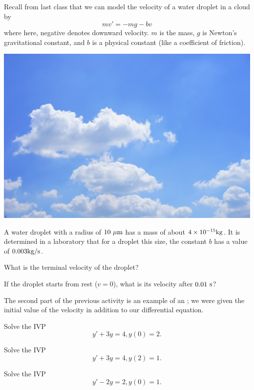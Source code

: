 
\begin{applicationActivities}

\begin{observation}
Recall from last class that we can model the velocity of a water droplet in a cloud by
\[mv'=-mg-bv\]
where here, negative denotes downward velocity.  \(m\) is the mass, \(g\) is Newton's gravitational constant, and \(b\) is a physical constant (like a coefficient of friction).
\begin{center}
\includegraphics[scale=0.2]{media/cloud.jpg}
\end{center}
\end{observation}

\begin{activity}{25}
A water droplet with a radius of \(10\ {\rm \mu m}\) has a mass of about \(4 \times 10^{-15} {\rm kg}\).  It is determined in a laboratory that for a droplet this size, the constant \(b\) has a value of \(0.003 {\rm kg/s}\).
\begin{subactivity}
What is the terminal velocity of the droplet?
\end{subactivity}
\begin{subactivity}If the droplet starts from rest (\(v=0\)), what is its velocity after \(0.01\ {\rm s}\)?
\end{subactivity}
\end{activity}

\begin{definition}
The second part of the previous activity is an example of an ; we were given the initial value of the velocity in addition to our differential equation.
\end{definition}

\begin{activity}{10}
Solve the IVP
\[y'+3y=4, y(0)=2.\]
\end{activity}

\begin{activity}{5}
Solve the IVP
\[y'+3y=4, y(2)=1.\]
\end{activity}

\begin{activity}{10}
Solve the IVP
\[y'-2y=2, y(0)=1.\]
\end{activity}


\end{applicationActivities}
